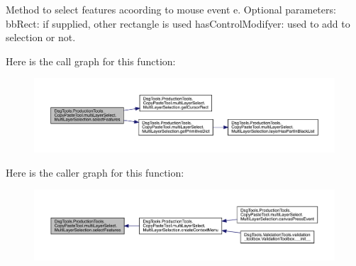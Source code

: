 \begin{DoxyVerb}Method to select features acoording to mouse event e.
Optional parameters:
bbRect: if supplied, other rectangle is used
hasControlModifyer: used to add to selection or not.
\end{DoxyVerb}
 Here is the call graph for this function\+:
\nopagebreak
\begin{figure}[H]
\begin{center}
\leavevmode
\includegraphics[width=350pt]{class_dsg_tools_1_1_production_tools_1_1_copy_paste_tool_1_1multi_layer_select_1_1_multi_layer_selection_a506db45cb8c41343be46a89578a9d59b_cgraph}
\end{center}
\end{figure}
Here is the caller graph for this function\+:
\nopagebreak
\begin{figure}[H]
\begin{center}
\leavevmode
\includegraphics[width=350pt]{class_dsg_tools_1_1_production_tools_1_1_copy_paste_tool_1_1multi_layer_select_1_1_multi_layer_selection_a506db45cb8c41343be46a89578a9d59b_icgraph}
\end{center}
\end{figure}
\mbox{\label{class_dsg_tools_1_1_production_tools_1_1_copy_paste_tool_1_1multi_layer_select_1_1_multi_layer_selection_a5247c0f55a8d4225bf8db316331a4406}} 

